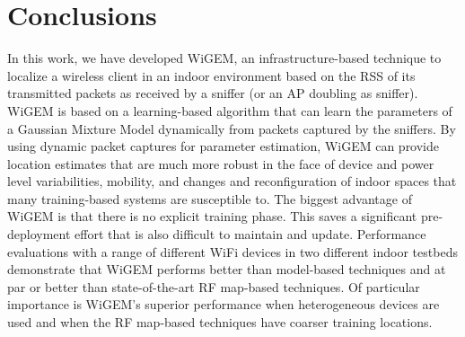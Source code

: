 
\section{Conclusions}
\label{sec:conclusions}

In this work, we have developed WiGEM, an infrastructure-based technique to localize a
wireless client in an indoor environment based on the RSS
 of its transmitted packets as received by a sniffer (or an AP doubling 
as sniffer). WiGEM is based on a learning-based
algorithm that can learn the parameters of a Gaussian Mixture Model
dynamically from packets captured by the sniffers.
By using dynamic packet captures for parameter
estimation, WiGEM can provide location estimates 
that are much more robust in the face of device and power level
variabilities, mobility, and changes
and reconfiguration of indoor spaces that many training-based systems
are susceptible to. The biggest advantage of WiGEM is that there is no explicit 
training phase. This saves a significant pre-deployment effort that is also
difficult to maintain and update. Performance evaluations with 
a range of different WiFi devices in two different indoor testbeds demonstrate
that WiGEM performs better than model-based techniques and at par or better than 
state-of-the-art RF map-based techniques. Of particular importance is WiGEM's
superior performance when heterogeneous devices are used and when the RF map-based
techniques have coarser training locations. 


%
